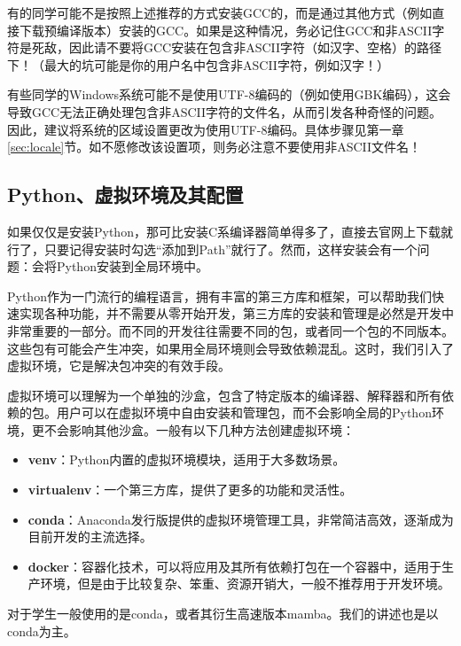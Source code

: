 \documentclass[../main.tex]{subfiles}
\begin{document}
\begin{caution}
  有的同学可能不是按照上述推荐的方式安装GCC的，而是通过其他方式（例如直接下载预编译版本）安装的GCC。如果是这种情况，务必记住GCC和非ASCII字符是死敌，因此请不要将GCC安装在包含非ASCII字符（如汉字、空格）的路径下！（最大的坑可能是你的用户名中包含非ASCII字符，例如汉字！）
\end{caution}

\begin{caution}
  有些同学的Windows系统可能不是使用UTF-8编码的（例如使用GBK编码），这会导致GCC无法正确处理包含非ASCII字符的文件名，从而引发各种奇怪的问题。因此，建议将系统的区域设置更改为使用UTF-8编码。具体步骤见第一章\ref{sec:locale}节。如不愿修改该设置项，则务必注意不要使用非ASCII文件名！
\end{caution}

\subsection{Python、虚拟环境及其配置}\label{sec:virtualenv}

如果仅仅是安装Python，那可比安装C系编译器简单得多了，直接去官网上下载就行了，只要记得安装时勾选“添加到Path”就行了。然而，这样安装会有一个问题：会将Python安装到全局环境中。

Python作为一门流行的编程语言，拥有丰富的第三方库和框架，可以帮助我们快速实现各种功能，并不需要从零开始开发，第三方库的安装和管理是必然是开发中非常重要的一部分。而不同的开发往往需要不同的包，或者同一个包的不同版本。这些包有可能会产生冲突，如果用全局环境则会导致依赖混乱。这时，我们引入了虚拟环境，它是解决包冲突的有效手段。

虚拟环境可以理解为一个单独的沙盒，包含了特定版本的编译器、解释器和所有依赖的包。用户可以在虚拟环境中自由安装和管理包，而不会影响全局的Python环境，更不会影响其他沙盒。一般有以下几种方法创建虚拟环境：
\begin{itemize}
  \item \textbf{venv}：Python内置的虚拟环境模块，适用于大多数场景。
  \item \textbf{virtualenv}：一个第三方库，提供了更多的功能和灵活性。
  \item \textbf{conda}：Anaconda发行版提供的虚拟环境管理工具，非常简洁高效，逐渐成为目前开发的主流选择。
  \item \textbf{docker}：容器化技术，可以将应用及其所有依赖打包在一个容器中，适用于生产环境，但是由于比较复杂、笨重、资源开销大，一般不推荐用于开发环境。
\end{itemize}

对于学生一般使用的是conda，或者其衍生高速版本mamba。我们的讲述也是以conda为主。
\end{document}
